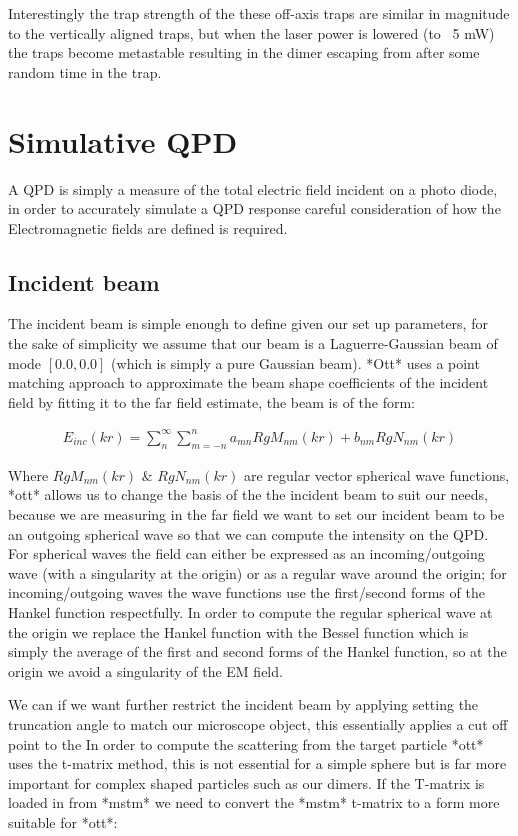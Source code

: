 \documentclass[a4paper,oneside,11pt]{book}
\begin{document}
Interestingly the trap strength of the these off-axis traps are similar in magnitude to the vertically aligned traps, but when the laser power is lowered (to ~5 mW) the traps become metastable resulting in the dimer escaping from after some random time in the trap. 

\section{Simulative QPD}
A QPD is simply a measure of the total electric field incident on a photo diode, in order to accurately simulate a QPD response careful consideration of how the Electromagnetic fields are defined is required. 

\subsection{Incident beam}
\label{sec:scattering}
The incident beam is simple enough to define given our set up parameters, for the sake of simplicity we assume that our beam is a Laguerre-Gaussian beam of mode $[0.0, 0.0]$ (which is simply a pure Gaussian beam). *Ott* uses a point matching approach to approximate the beam shape coefficients of the incident field by fitting it to the far field estimate, the beam is of the form:

\begin{align}
	E_{inc}(kr)=\sum^\infty_n\sum^n_{m=-n}a_{mn}RgM_{nm}(kr)+b_{nm}RgN_{nm}(kr)
\end{align}

Where $RgM_{nm}(kr)$ \& $RgN_{nm}(kr)$ are regular vector spherical wave functions, *ott* allows us to change the basis of the the incident beam to suit our needs, because we are measuring in the far field we want to set our incident beam to be an outgoing spherical wave so that we can compute the intensity on the QPD. For spherical waves the field can either be expressed as an incoming/outgoing wave (with a singularity at the origin) or as a regular wave around the origin; for incoming/outgoing waves the wave functions use the first/second forms of the Hankel function respectfully. In order to compute the regular spherical wave at the origin we replace the Hankel function with the Bessel function which is simply the average of the first and second forms of the Hankel function, so at the origin we avoid a singularity of the EM field.  

We can if we want further restrict the incident beam by applying setting the truncation angle to match our microscope object, this essentially applies a cut off point to the In order to compute the scattering from the target particle *ott* uses the t-matrix method, this is not essential for a simple sphere but is far more important for complex shaped particles such as our dimers. If the T-matrix is loaded in from *mstm* we need to convert the *mstm* t-matrix to a form more suitable for *ott*:
\end{document}
